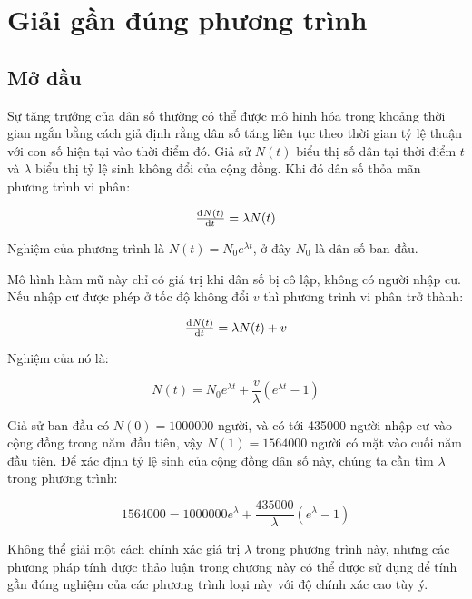 \documentclass[../../Lectures]{subfiles}
\begin{document}
\chapter{Giải gần đúng phương trình}


\section{Mở đầu}

Sự tăng trưởng của dân số thường có thể được mô hình hóa trong khoảng thời gian
ngắn bằng cách giả định rằng dân số tăng liên tục theo thời gian tỷ lệ thuận với
con số hiện tại vào thời điểm đó. Giả sử \(N(t)\) biểu thị số dân tại thời điểm
\(t\) và \(\lambda\) biểu thị tỷ lệ sinh không đổi của cộng đồng. Khi đó dân số
thỏa mãn phương trình vi phân:

\[\od{N(t)}{t} = \lambda N(t)\]

Nghiệm của phương trình là \(N(t) = N_0 e^{\lambda t}\), ở đây \(N_0\) là dân số
ban đầu.


Mô hình hàm mũ này chỉ có giá trị khi dân số bị cô lập, không có người nhập cư.
Nếu nhập cư được phép ở tốc độ không đổi \(v\) thì phương trình vi phân trở
thành:

\[\od{N(t)}{t} = \lambda N(t) + v\]

Nghiệm của nó là:

\[N(t) = N_0 e^{\lambda t} + \frac{v}{\lambda} (e^{\lambda t} - 1)\]

Giả sử ban đầu có \(N(0) = \num{1000000}\) người, và có tới \num{435000} người
nhập cư vào cộng đồng trong năm đầu tiên, vậy \(N(1) = \num{1564000}\) người có
mặt vào cuối năm đầu tiên. Để xác định tỷ lệ sinh của cộng đồng dân số này,
chúng ta cần tìm \(\lambda\) trong phương trình:

\[\num{1564000} = \num{1000000} e^\lambda + \frac{\num{435000}}{\lambda} (e^\lambda - 1)\]

Không thể giải một cách chính xác giá trị \(\lambda\) trong phương trình này,
nhưng các phương pháp tính được thảo luận trong chương này có thể được sử dụng
để tính gần đúng nghiệm của các phương trình loại này với độ chính xác cao tùy
ý.


\end{document}
